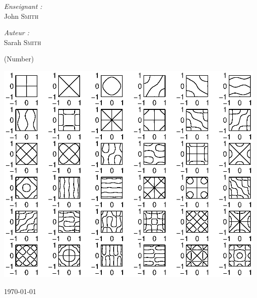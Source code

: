	\begin{minipage}{0.5\textwidth}
		\begin{center} \large
			\emph{Enseignant :} \\
			John \textsc{Smith}
		\end{center}
	\end{minipage}
	\begin{minipage}{0.5\textwidth}
		\begin{center} \large
			\vspace{0.05cm}
			\emph{Auteur :} \\
			Sarah \textsc{Smith}
			\begin{footnotesize} (Number)\end{footnotesize}
		\end{center}
	\end{minipage}

	\vspace{1cm}
	\begin{center}
		\includegraphics[scale=0.6]{images/cover.eps}
	\end{center}

  	\vfill
  	\begin{center}
        \normalsize \today
  	\end{center}
\clearpage
\restoregeometry

